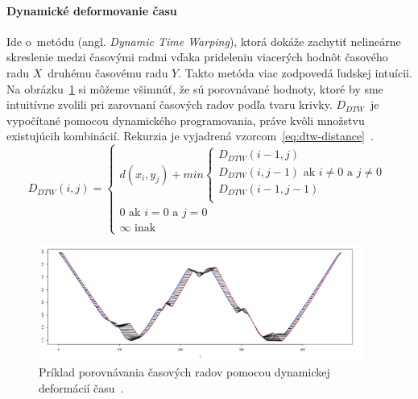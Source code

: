 \documentclass[a4paper,twoside,slovak,12pt,appendix]{article}
\begin{document}
\paragraph{Dynamické deformovanie času}
Ide o~metódu (angl. \textit{Dynamic Time Warping}), ktorá dokáže zachytiť
nelineárne skreslenie medzi časovými radmi vďaka prideleniu viacerých hodnôt
časového radu $X$~druhému časovému radu $Y$. Takto metóda viac zodpovedá ľudskej
intuícii. Na obrázku~\ref{fig:warping-distance} si môžeme všimnúť, že sú
porovnávané hodnoty, ktoré by sme intuitívne zvolili pri zarovnaní časových
radov podľa tvaru krivky. $D_{DTW}$~je vypočítané pomocou dynamického
programovania, práve kvôli množstvu existujúcih kombinácií. Rekurzia je
vyjadrená vzorcom~\ref{eq:dtw-distance}~\cite{Dzeroski2007,Fu2011}.
\begin{equation}
	\label{eq:dtw-distance}
  D_{DTW} \left( i, j \right) =
  \begin{cases}
    d \left( x_i, y_j \right) + min
    \begin{cases}
      D_{DTW} \left( i-1, j \right) \\
      D_{DTW} \left( i, j-1 \right) \text{ ak } i \neq 0 \text{ a } j \neq 0  \\
      D_{DTW} \left( i-1, j-1 \right) \\
    \end{cases} \\
    0 \text{ ak } i = 0 \text{ a } j = 0 \\
    \infty \text{ inak}
  \end{cases}
\end{equation}

\begin{figure}[]
  \centering
  \includegraphics[width=0.95\textwidth]{warping-distance.png}
  \caption{Príklad porovnávania časových radov pomocou dynamickej deformácií času~\cite{Malinowski2017}.}
  \label{fig:warping-distance}
\end{figure}
\end{document}
